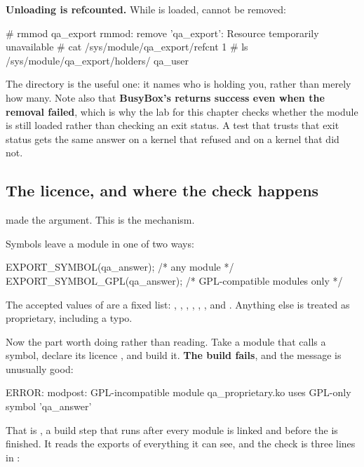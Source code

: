 \textbf{Unloading is refcounted.} While  is loaded,  cannot be
removed:

\begin{console}
# rmmod qa_export
rmmod: remove 'qa_export': Resource temporarily unavailable
# cat /sys/module/qa_export/refcnt
1
# ls /sys/module/qa_export/holders/
qa_user
\end{console}

\noindent The  directory is the useful one: it names who is holding you, rather than
merely how many. Note also that \textbf{BusyBox's  returns success even when the removal
failed}, which is why the lab for this chapter checks whether the module is still loaded rather
than checking an exit status. A test that trusts that exit status gets the same answer on a kernel
that refused and on a kernel that did not.

\subsection{The licence, and where the check happens}
\label{c4:app:a5}

 made the argument. This is the mechanism.

Symbols leave a module in one of two ways:

\begin{ccode}
EXPORT_SYMBOL(qa_answer);       /* any module */
EXPORT_SYMBOL_GPL(qa_answer);   /* GPL-compatible modules only */
\end{ccode}

\noindent The accepted values of  are a fixed list: , , , , , , and . Anything else is treated as proprietary, including a typo.

Now the part worth doing rather than reading. Take a module that calls a  symbol, declare
its licence , and build it. \textbf{The build fails}, and the message is
unusually good:

\begin{console}
ERROR: modpost: GPL-incompatible module qa_proprietary.ko uses GPL-only symbol 'qa_answer'
\end{console}

\noindent That is , a build step that runs after every module is linked and before the
 is finished. It reads the exports of everything it can see, and the check is three lines
in :

